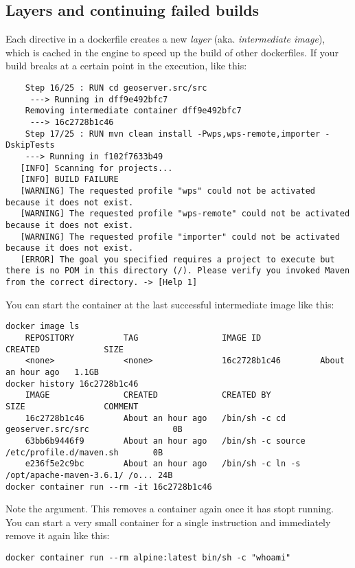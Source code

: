 \subsection{Layers and continuing failed builds}

Each directive in a dockerfile creates a new \emph{layer} (aka. \emph{intermediate image}), which is cached in the engine to speed up the build of other dockerfiles. 
If your build breaks at a certain point in the execution, like this: 

\begin{lstlisting}
    Step 16/25 : RUN cd geoserver.src/src
     ---> Running in dff9e492bfc7
    Removing intermediate container dff9e492bfc7
     ---> 16c2728b1c46
    Step 17/25 : RUN mvn clean install -Pwps,wps-remote,importer -DskipTests
    ---> Running in f102f7633b49
   [INFO] Scanning for projects...
   [INFO] BUILD FAILURE
   [WARNING] The requested profile "wps" could not be activated because it does not exist.
   [WARNING] The requested profile "wps-remote" could not be activated because it does not exist.
   [WARNING] The requested profile "importer" could not be activated because it does not exist.
   [ERROR] The goal you specified requires a project to execute but there is no POM in this directory (/). Please verify you invoked Maven from the correct directory. -> [Help 1]
\end{lstlisting}

You can start the container at the last successful intermediate image like this: 

\begin{lstlisting}
docker image ls 
    REPOSITORY          TAG                 IMAGE ID            CREATED             SIZE
    <none>              <none>              16c2728b1c46        About an hour ago   1.1GB
docker history 16c2728b1c46
    IMAGE               CREATED             CREATED BY                                      SIZE                COMMENT
    16c2728b1c46        About an hour ago   /bin/sh -c cd geoserver.src/src                 0B
    63bb6b9446f9        About an hour ago   /bin/sh -c source /etc/profile.d/maven.sh       0B
    e236f5e2c9bc        About an hour ago   /bin/sh -c ln -s /opt/apache-maven-3.6.1/ /o... 24B
docker container run --rm -it 16c2728b1c46
\end{lstlisting}

Note the  argument. This removes a container again once it has stopt running. You can start a very small container for a single instruction and immediately remove it again like this: 

\begin{lstlisting}
docker container run --rm alpine:latest bin/sh -c "whoami"
\end{lstlisting}





